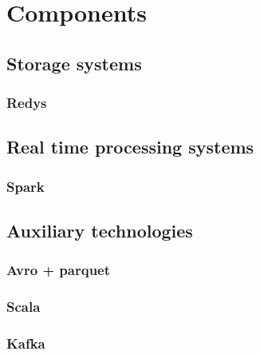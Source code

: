 \chapter{Components}
\label{chap:components}


\section{Storage systems}



\subsection{Redys}

\section{Real time processing systems}



\subsection{Spark}

\section{Auxiliary technologies}

\subsection{Avro + parquet}

\subsection{Scala}

\subsection{Kafka}



